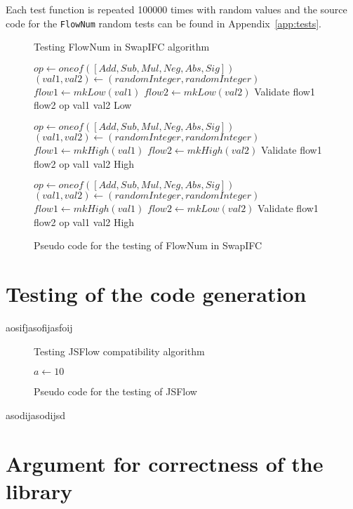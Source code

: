 Each test function is repeated 100000 times with random values and the source code for the {\tt FlowNum} random tests can be found in Appendix~\ref{app:tests}.

\begin{figure}[h]
  \begin{algorithm}[H]
    \caption{Testing FlowNum in SwapIFC algorithm}
    \begin{algorithmic}
      \State $op\gets oneof([Add, Sub, Mul, Neg, Abs, Sig])$
      \State $(val1, val2)\gets (randomInteger, randomInteger)$
      \State $flow1\gets mkLow(val1)$
      \State $flow2\gets mkLow(val2)$
      \State
      \Return Validate flow1 flow2 op val1 val2 Low
      \EndFunction

      \State $op\gets oneof([Add, Sub, Mul, Neg, Abs, Sig])$
      \State $(val1, val2)\gets (randomInteger, randomInteger)$
      \State $flow1\gets mkHigh(val1)$
      \State $flow2\gets mkHigh(val2)$
      \State
      \Return Validate flow1 flow2 op val1 val2 High
      \EndFunction

      \State $op\gets oneof([Add, Sub, Mul, Neg, Abs, Sig])$
      \State $(val1, val2)\gets (randomInteger, randomInteger)$
      \State $flow1\gets mkHigh(val1)$
      \State $flow2\gets mkLow(val2)$
      \State
      \Return Validate flow1 flow2 op val1 val2 High
      \EndFunction
    \end{algorithmic}
  \end{algorithm}
  \caption{Pseudo code for the testing of FlowNum in SwapIFC}
  \label{fig:testing_swapifc}
\end{figure}

\section{Testing of the code generation}
aosifjasofijasfoij
\begin{figure}[h]
  \begin{algorithm}[H]
    \caption{Testing JSFlow compatibility algorithm}
    \begin{algorithmic}
      \State $a\gets 10$
      \EndIf
    \end{algorithmic}
  \end{algorithm}
  \caption{Pseudo code for the testing of JSFlow}
  \label{fig:testing_jsflow}
\end{figure}
asodijasodijsd

\section{Argument for correctness of the library}
